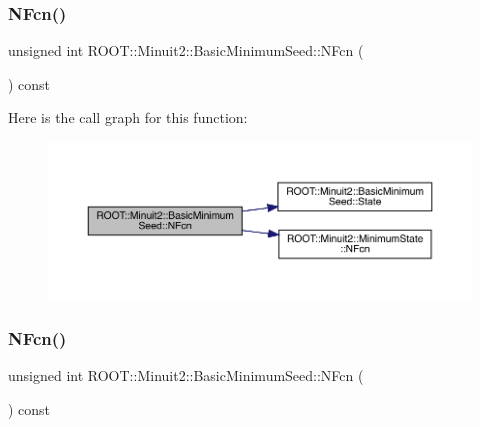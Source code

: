 \subsubsection{\texorpdfstring{NFcn()}{NFcn()}\hspace{0.1cm}{\footnotesize\ttfamily [2/3]}}
{\footnotesize\ttfamily unsigned int R\+O\+O\+T\+::\+Minuit2\+::\+Basic\+Minimum\+Seed\+::\+N\+Fcn (\begin{DoxyParamCaption}{ }\end{DoxyParamCaption}) const\hspace{0.3cm}{\ttfamily [inline]}}

Here is the call graph for this function\+:
\nopagebreak
\begin{figure}[H]
\begin{center}
\leavevmode
\includegraphics[width=350pt]{de/d50/classROOT_1_1Minuit2_1_1BasicMinimumSeed_a1d34718bf163936432ef05dea799c469_cgraph}
\end{center}
\end{figure}
\mbox{\label{classROOT_1_1Minuit2_1_1BasicMinimumSeed_a1d34718bf163936432ef05dea799c469}} 
\subsubsection{\texorpdfstring{NFcn()}{NFcn()}\hspace{0.1cm}{\footnotesize\ttfamily [3/3]}}
{\footnotesize\ttfamily unsigned int R\+O\+O\+T\+::\+Minuit2\+::\+Basic\+Minimum\+Seed\+::\+N\+Fcn (\begin{DoxyParamCaption}{ }\end{DoxyParamCaption}) const\hspace{0.3cm}{\ttfamily [inline]}}

